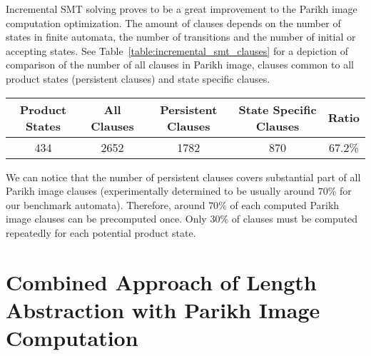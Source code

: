 Incremental SMT solving proves to be a great improvement to the Parikh image computation optimization. The amount of clauses depends on the number of states in finite automata, the number of transitions and the number of initial or accepting states. See Table~\ref{table:incremental_smt_clauses} for a depiction of comparison of the number of all clauses in Parikh image, clauses common to all product states (persistent clauses) and state specific clauses.

\begin{table*}[ht]
	\centering
    \begin{tabular}{ |c|c|c|c|c| }
        \hline
        Product States & All Clauses & Persistent Clauses & State Specific Clauses & Ratio \\ \hline
        434 & 2652 & 1782 & 870 & 67.2\% \\ \hline
    \end{tabular}
    \caption{An example proportion of persistent and state specific clauses in Parikh image computation with incremental SMT solving optimization. The \emph{Product States} column shows the number of product states in the whole intersection product, the \emph{All Clauses} column shows the number of clauses in each computed Parikh image, the \emph{Persistent Clauses} column shows the number of persistent clauses in the whole Parikh image (out of the all Parikh image clauses), \emph{State Specific Clauses} column states how many Parikh image clauses have to be recomputed for each product state and \emph{Ratio} column shows the ratio of persistent clauses in all Parikh image clauses.}
    \label{table:incremental_smt_clauses}
\end{table*}

We can notice that the number of persistent clauses covers substantial part of all Parikh image clauses (experimentally determined to be usually around $70 \%$ for our benchmark automata). Therefore, around $70\%$ of each computed Parikh image clauses can be precomputed once. Only $30\%$ of clauses must be computed repeatedly for each potential product state.

\section{Combined Approach of Length Abstraction with Parikh Image Computation}



